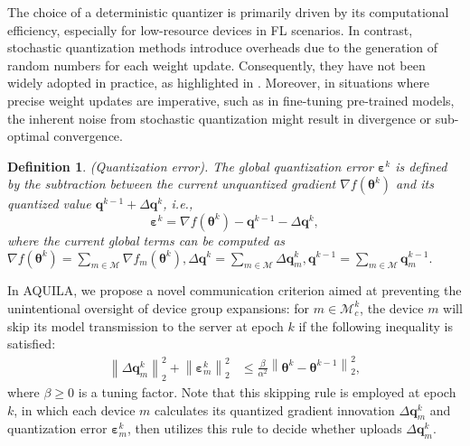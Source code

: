 \documentclass[lettersize,journal]{IEEEtran}
\newtheorem{definition}{Definition}
\begin{document}
The choice of a deterministic quantizer is primarily driven by its computational efficiency, especially for low-resource devices in FL scenarios. In contrast, stochastic quantization methods introduce overheads due to the generation of random numbers for each weight update. Consequently, they have not been widely adopted in practice, as highlighted in \cite{gholami2022survey}. Moreover, in situations where precise weight updates are imperative, such as in fine-tuning pre-trained models, the inherent noise from stochastic quantization might result in divergence or sub-optimal convergence.
\begin{definition}(Quantization error). \textit{
The global quantization error $\boldsymbol{\varepsilon}^k$ is defined by the subtraction between the current unquantized gradient $\nabla f (\boldsymbol{\theta}^k)$ and its quantized value $\boldsymbol{q}^{k-1} + \Delta \boldsymbol{q}^k$, i.e.,}
\begin{equation}
    \boldsymbol{\varepsilon}^k = \nabla f (\boldsymbol{\theta}^k) - \boldsymbol{q}^{k-1} - \Delta \boldsymbol{q}^k,
    \label{def_quanti_error}
\end{equation}
where the current global terms can be computed as $\nabla f (\boldsymbol{\theta}^k) \!=\! \sum_{m \in \mathcal{M}} \nabla f_m (\boldsymbol{\theta}^k), \Delta 
\boldsymbol{q}^{k} \!=\! \sum_{m \in \mathcal{M}} \Delta \boldsymbol{q}_m^{k},   \boldsymbol{q}^{k-1} \!=\! \sum_{m \in \mathcal{M}} \boldsymbol{q}_m^{k-1} .$
\end{definition}



In AQUILA, we propose a novel communication criterion aimed at preventing the unintentional oversight of device group expansions: for $m \in \mathcal{M}_c^k$, the device $m$ will skip its model transmission to the server at epoch $k$ if the following inequality is satisfied:
\begin{equation}
\begin{aligned}
 \left\| \Delta \boldsymbol{q}_{m}^{k}\right\|_2^2 + \left\|\boldsymbol{\varepsilon}_m^{k}\right\|_2^2 &\leqslant \frac{\beta}{ \alpha^2}\left\| \boldsymbol{\theta}^{k}-\boldsymbol{\theta}^{k-1} \right\|_2^2,
\end{aligned}
\label{skip_rule}
\end{equation}
where $\beta \geqslant 0$ is a tuning factor. Note that this skipping rule is employed at epoch $k$, in which each device $m$ calculates its quantized gradient innovation $\Delta \boldsymbol{q}_{m}^{k}$ and quantization error $\boldsymbol{\varepsilon}_m^{k}$, then utilizes this rule to decide whether uploads $\Delta \boldsymbol{q}_{m}^{k}$.
\end{document}
